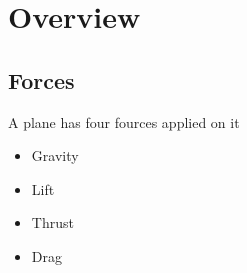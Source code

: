\section{Overview}

\subsection{Forces}

  A plane has four fources applied on it

  \begin{itemize}
    \item Gravity
    \item Lift
    \item Thrust
    \item Drag
  \end{itemize}
